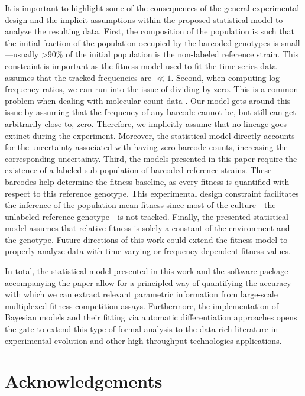 \documentclass[
]{scrartcl}
\begin{document}
\begin{refsegment}
It is important to highlight some of the consequences of the general
experimental design and the implicit assumptions within the proposed
statistical model to analyze the resulting data. First, the composition
of the population is such that the initial fraction of the population
occupied by the barcoded genotypes is small---usually \textgreater90\%
of the initial population is the non-labeled reference strain. This
constraint is important as the fitness model used to fit the time series
data assumes that the tracked frequencies are \(\ll 1\). Second, when
computing log frequency ratios, we can run into the issue of dividing by
zero. This is a common problem when dealing with molecular count data
\autocite{lovell2020}. Our model gets around this issue by assuming that
the frequency of any barcode cannot be, but still can get arbitrarily
close to, zero. Therefore, we implicitly assume that no lineage goes
extinct during the experiment. Moreover, the statistical model directly
accounts for the uncertainty associated with having zero barcode counts,
increasing the corresponding uncertainty. Third, the models presented in
this paper require the existence of a labeled sub-population of barcoded
reference strains. These barcodes help determine the fitness baseline,
as every fitness is quantified with respect to this reference genotype.
This experimental design constraint facilitates the inference of the
population mean fitness since most of the culture---the unlabeled
reference genotype---is not tracked. Finally, the presented statistical
model assumes that relative fitness is solely a constant of the
environment and the genotype. Future directions of this work could
extend the fitness model to properly analyze data with time-varying or
frequency-dependent fitness values.

In total, the statistical model presented in this work and the software
package accompanying the paper allow for a principled way of quantifying
the accuracy with which we can extract relevant parametric information
from large-scale multiplexed fitness competition assays. Furthermore,
the implementation of Bayesian models and their fitting via automatic
differentiation approaches opens the gate to extend this type of formal
analysis to the data-rich literature in experimental evolution and other
high-throughput technologies applications.

\hypertarget{acknowledgements}{%
\section{Acknowledgements}\label{acknowledgements}}


\end{refsegment}
\end{document}

